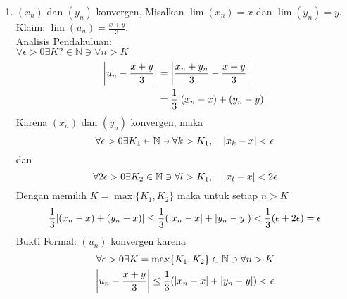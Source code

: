 \documentclass{article}
\begin{document}
\begin{enumerate}[leftmargin=*, label={\arabic*}.]


\item $(x_n)$ dan $(y_n)$ konvergen, Misalkan $\lim(x_n)=x$ dan $\lim(y_n)=y$.\\
Klaim: $\lim(u_n) = \frac{x+y}{3}$.\\
Analisis Pendahuluan:\\
$\forall \epsilon > 0 \exists K?\in\mathbb{N} \ni \forall n > K$
\begin{align*}
    \abs*{u_n-\frac{x+y}{3}}&=\abs*{\frac{x_n+y_n}{3}-\frac{x+y}{3}}\\
    &=\frac{1}{3}\abs*{(x_n-x)+(y_n-y)}
\end{align*}
Karena $(x_n)$ dan $(y_n)$ konvergen, maka\\
\[\forall \epsilon > 0 \exists K_1\in\mathbb{N} \ni \forall k > K_1,\quad
\lvert x_k-x\rvert < \epsilon\]
dan
\[\forall 2\epsilon > 0 \exists K_2\in\mathbb{N} \ni \forall l > K_1,\quad
\lvert x_l-x\rvert < 2\epsilon\]
Dengan memilih $K =\max\{K_1,K_2\}$ maka untuk setiap $n > K$
\[
    \frac{1}{3}\abs{(x_n-x)+(y_n-x)} \leq \frac{1}{3}\oio*{\abs{x_n-x}+\abs{y_n-y}}<
    \frac{1}{3}\oio*{\epsilon+2\epsilon} = \epsilon
\]
Bukti Formal: $(u_n)$ konvergen karena
\begin{align*}
    \forall \epsilon > 0 \exists K = \max\{K_1,K_2\} \in \mathbb{N} \ni \forall n > K\\
    \abs*{u_n - \frac{x+y}{3}} \leq \frac{1}{3}\oio*{\abs{x_n-x}+\abs{y_n-y}} < \epsilon
\end{align*}


\end{enumerate}
\end{document}

